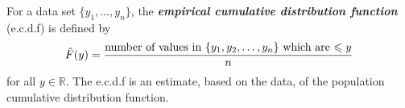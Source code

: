 \begin{Definition}{}{}
    For a data set $ \{y_1,\ldots ,y_n\} $, the \textbf{\emph{empirical cumulative distribution function}}
    (e.c.d.f) is defined by
    \[ \hat{F}(y)=\frac{\text{number of values in $ \{y_1,y_2,\ldots ,y_n\} $ which are $ \leqslant y $}}{n} \]
    for all $ y\in\mathbb{R} $.
    The e.c.d.f is an estimate, based on the data, of the population cumulative distribution function.
\end{Definition}

